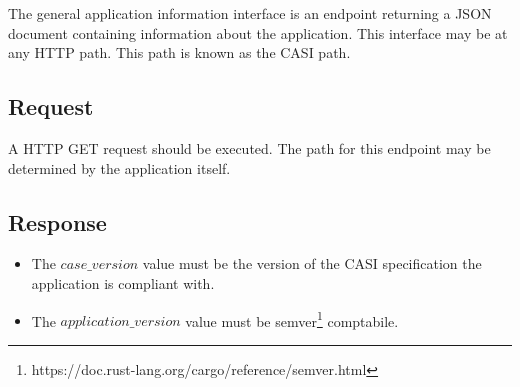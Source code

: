 The general application information interface is an endpoint
returning a JSON document containing information about the application.
This interface may be at any HTTP path.
This path is known as the CASI path.

\subsection{Request}
\label{subsec:request-general-application-information}

A HTTP GET request should be executed.
The path for this endpoint may be determined by the application itself.

\subsection{Response}
\label{subsec:response-general-application-information}

\begin{itemize}
    \item The $case\_version$ value must be the version of the CASI specification the application is compliant with.
    \item The $application\_version$ value must be semver\footnote{https://doc.rust-lang.org/cargo/reference/semver.html} comptabile.
\end{itemize}



